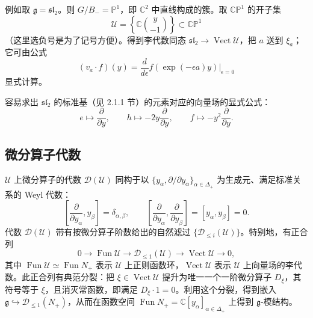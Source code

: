 
例如取 $\mathfrak{g}=\mathfrak{sl}_2$。则 $G/B_-=\mathbb{P}^1$，即 $\mathbb{C}^2$ 中直线构成的簇。取 $\mathbb{CP}^1$ 的开子集
\[
    \mathcal{U}=\left\{\mathbb{C}\binom{y}{-1}\right\}\subset\mathbb{CP}^1
\]
（这里选负号是为了记号方便）。得到李代数同态 $\mathfrak{sl}_2\to\operatorname{Vect}\mathcal{U}$，把 $a$ 送到 $\xi_a$；它可由公式
\[
    (v_a\cdot f)(y)=\frac{d}{d\epsilon}f(\exp(-\epsilon a)y)\big|_{\epsilon=0}
\]
显式计算。

容易求出 $\mathfrak{sl}_2$ 的标准基（见 2.1.1 节）的元素对应的向量场的显式公式：
\begin{equation}
    e\mapsto\frac{\partial}{\partial y},\qquad
    h\mapsto -2y\frac{\partial}{\partial y},\qquad
    f\mapsto -y^2\frac{\partial}{\partial y}.
    \tag{5.2-5}
\end{equation}


\subsection{微分算子代数}

$\mathcal{U}$ 上微分算子的代数 $\mathcal{D}(\mathcal{U})$ 同构于以 $\{y_\alpha,\partial/\partial y_\alpha\}_{\alpha\in\Delta_+}$ 为生成元、满足标准关系的 Weyl 代数：
\[
    \left[\frac{\partial}{\partial y_\alpha},y_\beta\right]=\delta_{\alpha,\beta},
    \qquad
    \left[\frac{\partial}{\partial y_\alpha},\frac{\partial}{\partial y_\beta}\right]
    =[y_\alpha,y_\beta]=0.
\]
代数 $\mathcal{D}(\mathcal{U})$ 带有按微分算子阶数给出的自然滤过 $\{\mathcal{D}_{\le i}(\mathcal{U})\}$。特别地，有正合列
\begin{equation}
    0\to\operatorname{Fun}\mathcal{U}\to\mathcal{D}_{\le1}(\mathcal{U})\to\operatorname{Vect}\mathcal{U}\to 0,
    \tag{5.2-6}
\end{equation}
其中 $\operatorname{Fun}\mathcal{U}\simeq\operatorname{Fun}N_+$ 表示 $\mathcal{U}$ 上正则函数环，$\operatorname{Vect}\mathcal{U}$ 表示 $\mathcal{U}$ 上向量场的李代数。此正合列有典范分裂：把 $\xi\in\operatorname{Vect}\mathcal{U}$ 提升为唯一一个一阶微分算子 $D_\xi$，其符号等于 $\xi$，且消灭常函数，即满足 $D_\xi\cdot1=0$。利用这个分裂，得到嵌入 $\mathfrak{g}\hookrightarrow\mathcal{D}_{\le1}(N_+)$，从而在函数空间 $\operatorname{Fun}N_+=\mathbb{C}[y_\alpha]_{\alpha\in\Delta_+}$ 上得到 $\mathfrak{g}$-模结构。

